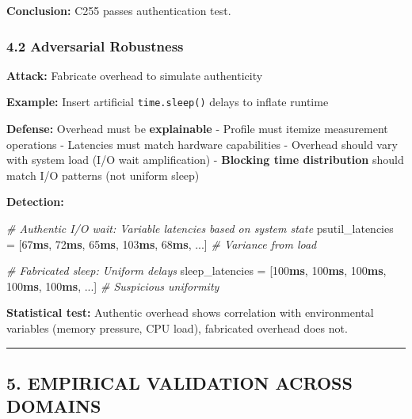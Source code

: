 \documentclass[
]{article}
\newenvironment{Shaded}{}{}
\newcommand{\CommentTok}[1]{\textcolor[rgb]{0.38,0.63,0.69}{\textit{#1}}}
\newcommand{\DecValTok}[1]{\textcolor[rgb]{0.25,0.63,0.44}{#1}}
\newcommand{\ErrorTok}[1]{\textcolor[rgb]{1.00,0.00,0.00}{\textbf{#1}}}
\newcommand{\NormalTok}[1]{#1}
\newcommand{\OperatorTok}[1]{\textcolor[rgb]{0.40,0.40,0.40}{#1}}
\begin{document}
\textbf{Conclusion:} C255 passes authentication test.

\subsubsection{4.2 Adversarial Robustness}\label{adversarial-robustness}

\textbf{Attack:} Fabricate overhead to simulate authenticity

\textbf{Example:} Insert artificial \texttt{time.sleep()} delays to
inflate runtime

\textbf{Defense:} Overhead must be \textbf{explainable} - Profile must
itemize measurement operations - Latencies must match hardware
capabilities - Overhead should vary with system load (I/O wait
amplification) - \textbf{Blocking time distribution} should match I/O
patterns (not uniform sleep)

\textbf{Detection:}

\begin{Shaded}
\begin{Highlighting}[]
\CommentTok{\# Authentic I/O wait: Variable latencies based on system state}
\NormalTok{psutil\_latencies }\OperatorTok{=}\NormalTok{ [}\DecValTok{67}\ErrorTok{ms}\NormalTok{, }\DecValTok{72}\ErrorTok{ms}\NormalTok{, }\DecValTok{65}\ErrorTok{ms}\NormalTok{, }\DecValTok{103}\ErrorTok{ms}\NormalTok{, }\DecValTok{68}\ErrorTok{ms}\NormalTok{, ...]  }\CommentTok{\# Variance from load}

\CommentTok{\# Fabricated sleep: Uniform delays}
\NormalTok{sleep\_latencies }\OperatorTok{=}\NormalTok{ [}\DecValTok{100}\ErrorTok{ms}\NormalTok{, }\DecValTok{100}\ErrorTok{ms}\NormalTok{, }\DecValTok{100}\ErrorTok{ms}\NormalTok{, }\DecValTok{100}\ErrorTok{ms}\NormalTok{, }\DecValTok{100}\ErrorTok{ms}\NormalTok{, ...]  }\CommentTok{\# Suspicious uniformity}
\end{Highlighting}
\end{Shaded}

\textbf{Statistical test:} Authentic overhead shows correlation with
environmental variables (memory pressure, CPU load), fabricated overhead
does not.

\begin{center}\rule{0.5\linewidth}{0.5pt}\end{center}

\subsection{5. EMPIRICAL VALIDATION ACROSS
DOMAINS}\label{empirical-validation-across-domains}
\end{document}
